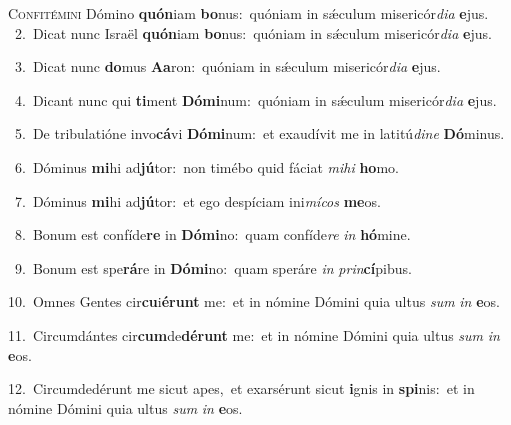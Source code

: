 \lettrine{\initial\textcolor{\initialcolor}{C}}{onfitémini} Dómino \textbf{quón}\-iam \textbf{bo}\-nus:~\star quóniam in sǽculum misericór\-\textit{di}\-\textit{a} \textbf{e}\-jus.\\
{\numbfont\textcolor{\numbcolor}{~2.}}~Dicat nunc Israël \textbf{quón}\-iam \textbf{bo}\-nus:~\star quóniam in sǽculum misericór\-\textit{di}\-\textit{a} \textbf{e}\-jus.\par
{\numbfont\textcolor{\numbcolor}{~3.}}~Dicat nunc \textbf{do}\-mus \textbf{A}\-\textbf{a}ron:~\star quóniam in sǽculum misericór\-\textit{di}\-\textit{a} \textbf{e}\-jus.\par
{\numbfont\textcolor{\numbcolor}{~4.}}~Dicant nunc qui \textbf{ti}\-ment \textbf{Dó}\-\textbf{mi}num:~\star quóniam in sǽculum misericór\-\textit{di}\-\textit{a} \textbf{e}\-jus.\par
{\numbfont\textcolor{\numbcolor}{~5.}}~De tribulatióne invo\-\textbf{cá}\-vi \textbf{Dó}\-\textbf{mi}num:~\star et exaudívit me in latitú\-\textit{di}\-\textit{ne} \textbf{Dó}\-minus.\par
{\numbfont\textcolor{\numbcolor}{~6.}}~Dóminus \textbf{mi}\-hi ad\-\textbf{jú}\-tor:~\star non timébo quid fáciat \textit{mi}\-\textit{hi} \textbf{ho}\-mo.\par
{\numbfont\textcolor{\numbcolor}{~7.}}~Dóminus \textbf{mi}\-hi ad\-\textbf{jú}\-tor:~\star et ego despíciam ini\-\textit{mí}\-\textit{cos} \textbf{me}\-os.\par
{\numbfont\textcolor{\numbcolor}{~8.}}~Bonum est confíde\textbf{re} in \textbf{Dó}\-\textbf{mi}no:~\star quam confíde\textit{re} \textit{in} \textbf{hó}\-mine.\par
{\numbfont\textcolor{\numbcolor}{~9.}}~Bonum est spe\-\textbf{rá}\-re in \textbf{Dó}\-\textbf{mi}no:~\star quam speráre \textit{in} \textit{prin}\-\textbf{cí}pibus.\par
{\numbfont\textcolor{\numbcolor}{10.}}~Omnes Gentes cir\-\textbf{cu}\-i\-\textbf{é}\-\textbf{runt} me:~\star et in nómine Dómini quia ultus \textit{sum} \textit{in} \textbf{e}\-os.\par
{\numbfont\textcolor{\numbcolor}{11.}}~Circumdántes cir\-\textbf{cum}\-de\-\textbf{dé}\-\textbf{runt} me:~\star et in nómine Dómini quia ultus \textit{sum} \textit{in} \textbf{e}\-os.\par
{\numbfont\textcolor{\numbcolor}{12.}}~Circumdedérunt me sicut apes,~\dagger et exarsérunt sicut \textbf{i}\-gnis in \textbf{spi}\-nis:~\star et in nómine Dómini quia ultus \textit{sum} \textit{in} \textbf{e}\-os.\par

